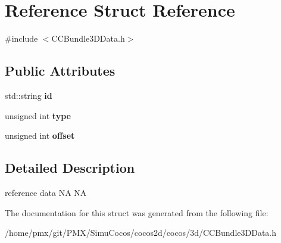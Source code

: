 \hypertarget{structReference}{}\section{Reference Struct Reference}
\label{structReference}


{\ttfamily \#include $<$C\+C\+Bundle3\+D\+Data.\+h$>$}

\subsection*{Public Attributes}
\begin{DoxyCompactItemize}
\item 
\mbox{\label{structReference_a763281d25867c42c16a990b45a6a080b}} 
std\+::string {\bfseries id}
\item 
\mbox{\label{structReference_a1e90625e1f6996313d65ccd9f0b0cf9f}} 
unsigned int {\bfseries type}
\item 
\mbox{\label{structReference_ae1425bc30c0ec2c9ef2a546eeee79537}} 
unsigned int {\bfseries offset}
\end{DoxyCompactItemize}


\subsection{Detailed Description}
reference data  NA  NA 

The documentation for this struct was generated from the following file\+:\begin{DoxyCompactItemize}
\item 
/home/pmx/git/\+P\+M\+X/\+Simu\+Cocos/cocos2d/cocos/3d/C\+C\+Bundle3\+D\+Data.\+h\end{DoxyCompactItemize}
